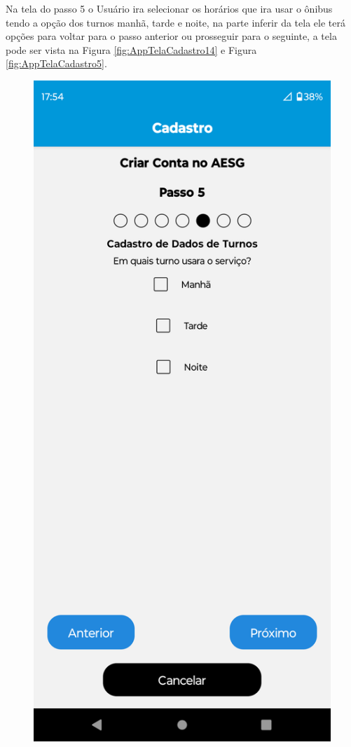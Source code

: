 \documentclass[
    12pt,                   %
    openright,              %
    oneside,                %
    a4paper,                %
    sumario=tradicional,    %
    english,                %
    brazil,                 %
    ]{abntex2}
\begin{document}
            \newpage
            Na tela do passo 5 o Usuário ira selecionar os horários que ira usar o ônibus tendo a opção dos turnos manhã, tarde e noite, na parte inferir da tela ele terá opções para voltar para o passo anterior ou prosseguir para o seguinte, a tela pode ser vista na Figura \ref{fig:AppTelaCadastro14} e Figura \ref{fig:AppTelaCadastro5}.
            \begin{figure}[!h]          
                \begin{minipage}{0.5\textwidth}
                    \centering
                    \includegraphics[width=0.8\linewidth]{Imagens/App Images User/AUCadastro14.png}

\end{minipage}
\end{figure}
\end{document}
